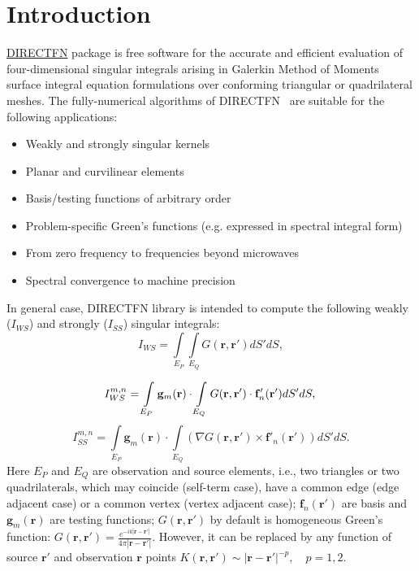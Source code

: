 \documentclass[a4wide,11pt]{article}
\date{}
\renewcommand{\[}{\begin{equation}}
\renewcommand{\]}{\end{equation}}
\renewcommand{\{}{\begin{eqnarray}}
\renewcommand{\}}{\end{eqnarray}}
\renewcommand{\vec}{\mathbf}
\begin{document}
	
	
\section{Introduction}

\href{https://github.com/thanospol/DIRECTFN}{DIRECTFN} package is free software for the accurate and efficient evaluation of four-dimensional singular integrals arising in Galerkin Method of Moments surface integral 
equation formulations over conforming triangular or quadrilateral meshes.  The fully-numerical algorithms of DIRECTFN~\cite{Polimeridis2013} are suitable for the following applications: 

\begin{itemize}
\item Weakly and strongly singular kernels
\item Planar and curvilinear elements
\item Basis/testing functions of arbitrary order
\item Problem-specific Green's functions (e.g. expressed in spectral integral form)
\item From zero frequency to frequencies beyond microwaves
\item Spectral convergence to machine precision
\end{itemize}

In general case,  DIRECTFN library is intended to compute the following weakly ($I_{WS}$) and strongly ($I_{SS}$) singular integrals:	
\[
\label{I_const_tri}
I_{WS} = \int\limits_{E_P}\int\limits_{E_Q} G(\vec r, \vec r') dS' dS,
\] 

\[
\label{I_WS}
I_{WS}^{m,n} = \int\limits_{E_P} \vec g_m(\vec r) \cdot\int\limits_{E_Q}  G(\vec r, \vec r') \cdot\vec f'_n(\vec r') dS' dS,\\
\]
\[
\label{I_SS}
I_{SS}^{m,n} = \int\limits_{E_P} \vec g_m(\vec r) \cdot\int\limits_{E_Q} (\nabla G(\vec r, \vec r') \times \vec f'_n(\vec r')) dS' dS.
\]
Here $E_P$ and $E_Q$ are observation and source elements, i.e., two triangles or two quadrilaterals, which may coincide (self-term case), have a common edge (edge adjacent case) or a common vertex (vertex adjacent case); $\vec f_n(\vec r')$ are basis and $\vec g_m(\vec r)$ are testing functions; $G(\vec r,\vec r')$ by default is homogeneous Green's function: $G(\vec r, \vec r') = \frac{e^{-ik|\vec r - \vec r'|}}{4\pi|\vec r - \vec r'|}$. However, it can be replaced by any function of source $\vec r'$ and observation $\vec r$ points $K(\vec r, \vec r') \sim |\vec r - \vec r'|^{-p},\quad p = 1, 2$.
\end{document}
